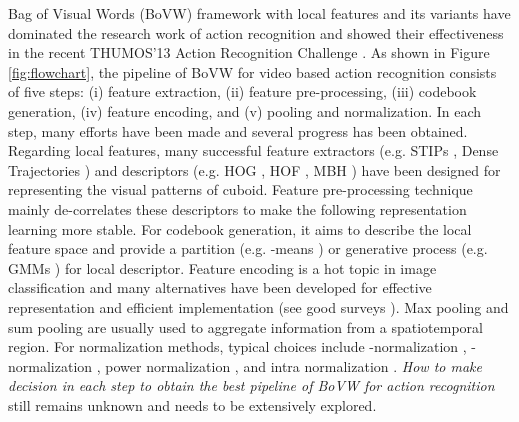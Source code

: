 \documentclass[twocolumn]{svjour3}          \smartqed  \usepackage{slashbox}
\begin{document}
Bag of Visual Words (BoVW) framework with local features and its variants \cite{Wang13,Wu13,Karaman13,Murthy13,PengWCQP13} have dominated the research work of action recognition and showed their effectiveness in the recent THUMOS'13 Action Recognition Challenge \cite{THUMOS13}. As shown in Figure \ref{fig:flowchart}, the pipeline of BoVW for video based action recognition consists of five steps: (i) feature extraction, (ii) feature pre-processing, (iii) codebook generation, (iv) feature encoding, and (v) pooling and normalization. In each step, many efforts have been made and several progress has been obtained. Regarding local features, many successful feature extractors (e.g. STIPs \cite{Laptev05}, Dense Trajectories \cite{WangKSL13}) and descriptors (e.g. HOG \cite{LaptevMSR08}, HOF \cite{LaptevMSR08}, MBH \cite{WangKSL13}) have been designed for representing the visual patterns of cuboid. Feature pre-processing technique mainly de-correlates these descriptors to make the following representation learning more stable. For codebook generation, it aims to describe the local feature space and provide a partition (e.g. -means \cite{Bishop06}) or generative process (e.g. GMMs \cite{Bishop06}) for local descriptor.  Feature encoding is a hot topic in image classification and many alternatives have been developed for effective representation and efficient implementation (see good surveys \cite{ChatfieldLVZ11,HuangWWT14}). Max pooling \cite{YangYGH09} and sum pooling \cite{ZhangMLS07} are usually used to aggregate information from a spatiotemporal region. For normalization methods, typical choices include -normalization \cite{ZhangMLS07}, -normalization \cite{WangYYLHG10}, power normalization \cite{PerronninSM10}, and intra normalization \cite{ArandjelovicZ13}. \emph{How to make decision in each step to obtain the best pipeline of BoVW for action recognition} still remains unknown and needs to be extensively explored.
\end{document}
